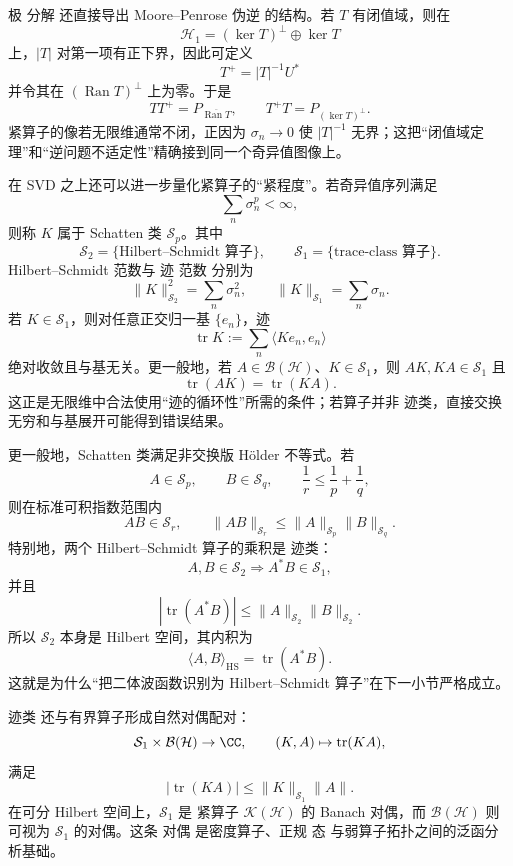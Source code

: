 极 分解 还直接导出 Moore--Penrose 伪逆 的结构。若 $T$ 有闭值域，则在
\[
\mathcal H_1=(\ker T)^\perp\oplus\ker T
\]
上，$|T|$ 对第一项有正下界，因此可定义
\[
T^+=|T|^{-1}U^*
\]
并令其在 $(\operatorname{Ran}T)^\perp$ 上为零。于是
\[
TT^+=P_{\overline{\operatorname{Ran}T}},
\qquad
T^+T=P_{(\ker T)^\perp}.
\]
紧算子的像若无限维通常不闭，正因为 $\sigma_n\to0$ 使 $|T|^{-1}$ 无界；这把“闭值域定理”和“逆问题不适定性”精确接到同一个奇异值图像上。

在 SVD 之上还可以进一步量化紧算子的``紧程度''。若奇异值序列满足
\[
\sum_n \sigma_n^p<\infty,
\]
则称 $K$ 属于 Schatten 类 $\mathcal S_p$。其中
\[
\mathcal S_2=\{\text{Hilbert--Schmidt 算子}\},
\qquad
\mathcal S_1=\{\text{trace-class 算子}\}.
\]
Hilbert--Schmidt 范数与 迹 范数 分别为
\[
\|K\|_{\mathcal S_2}^2
=\sum_n\sigma_n^2,
\qquad
\|K\|_{\mathcal S_1}
=\sum_n\sigma_n.
\]
若 $K\in\mathcal S_1$，则对任意正交归一基 $\{e_n\}$，迹
\[
\boxed{
\operatorname{tr}K
:=\sum_n\langle Ke_n,e_n\rangle
}
\]
绝对收敛且与基无关。更一般地，若 $A\in\mathcal B(\mathcal H)$、$K\in\mathcal S_1$，则 $AK,KA\in\mathcal S_1$ 且
\[
\operatorname{tr}(AK)=\operatorname{tr}(KA).
\]
这正是无限维中合法使用``迹的循环性''所需的条件；若算子并非 迹类，直接交换无穷和与基展开可能得到错误结果。

更一般地，Schatten 类满足非交换版 H\"older 不等式。若
\[
A\in\mathcal S_p,
\qquad
B\in\mathcal S_q,
\qquad
\frac1r\le\frac1p+\frac1q,
\]
则在标准可积指数范围内
\[
AB\in\mathcal S_r,
\qquad
\|AB\|_{\mathcal S_r}
\le
\|A\|_{\mathcal S_p}\|B\|_{\mathcal S_q}.
\]
特别地，两个 Hilbert--Schmidt 算子的乘积是 迹类：
\[
A,B\in\mathcal S_2
\Longrightarrow
A^*B\in\mathcal S_1,
\]
并且
\[
|\operatorname{tr}(A^*B)|
\le
\|A\|_{\mathcal S_2}\|B\|_{\mathcal S_2}.
\]
所以 $\mathcal S_2$ 本身是 Hilbert 空间，其内积为
\begin{equation*}\langle A,B\rangle_{\mathrm{HS}}
=\operatorname{tr}(A^*B).\end{equation*}
这就是为什么“把二体波函数识别为 Hilbert--Schmidt 算子”在下一小节严格成立。

迹类 还与有界算子形成自然对偶配对：
\[
\mathcal S_1\times\mathcal B(\mathcal H)\to\CC,
\qquad
(K,A)\mapsto\operatorname{tr}(KA),
\]
满足
\[
|\operatorname{tr}(KA)|
\le\|K\|_{\mathcal S_1}\|A\|.
\]
在可分 Hilbert 空间上，$\mathcal S_1$ 是 紧算子 $\mathcal K(\mathcal H)$ 的 Banach 对偶，而 $\mathcal B(\mathcal H)$ 则可视为 $\mathcal S_1$ 的对偶。这条 对偶 是密度算子、正规 态 与弱算子拓扑之间的泛函分析基础。

